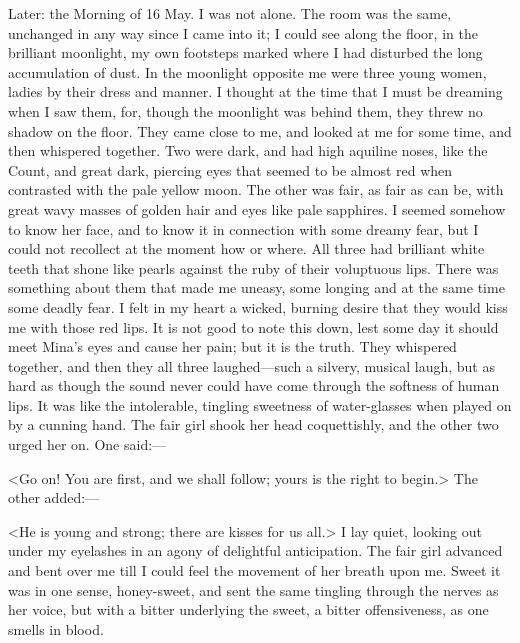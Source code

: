 \begin{diary}{Later: the Morning of 16 May.}
I was not alone. The room was the same, unchanged in any way since I came into it; I could see along the floor, in the brilliant moonlight, my own footsteps marked where I had disturbed the long accumulation of dust. In the moonlight opposite me were three young women, ladies by their dress and manner. I thought at the time that I must be dreaming when I saw them, for, though the moonlight was behind them, they threw no shadow on the floor. They came close to me, and looked at me for some time, and then whispered together. Two were dark, and had high aquiline noses, like the Count, and great dark, piercing eyes that seemed to be almost red when contrasted with the pale yellow moon. The other was fair, as fair as can be, with great wavy masses of golden hair and eyes like pale sapphires. I seemed somehow to know her face, and to know it in connection with some dreamy fear, but I could not recollect at the moment how or where. All three had brilliant white teeth that shone like pearls against the ruby of their voluptuous lips. There was something about them that made me uneasy, some longing and at the same time some deadly fear. I felt in my heart a wicked, burning desire that they would kiss me with those red lips. It is not good to note this down, lest some day it should meet Mina's eyes and cause her pain; but it is the truth. They whispered together, and then they all three laughed—such a silvery, musical laugh, but as hard as though the sound never could have come through the softness of human lips. It was like the intolerable, tingling sweetness of water-glasses when played on by a cunning hand. The fair girl shook her head coquettishly, and the other two urged her on. One said:—

<Go on! You are first, and we shall follow; yours is the right to begin.> The other added:—

<He is young and strong; there are kisses for us all.> I lay quiet, looking out under my eyelashes in an agony of delightful anticipation. The fair girl advanced and bent over me till I could feel the movement of her breath upon me. Sweet it was in one sense, honey-sweet, and sent the same tingling through the nerves as her voice, but with a bitter underlying the sweet, a bitter offensiveness, as one smells in blood.


\end{diary}
